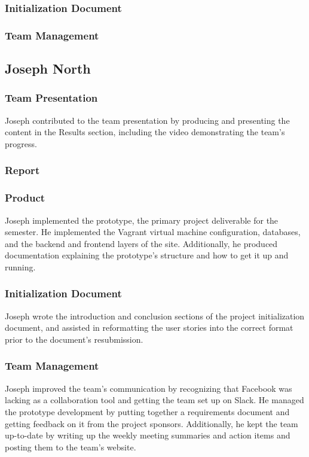 \documentclass[12pt]{article}
\begin{document}
\begin{spacing}{1.5}
\subsubsection{Initialization Document}
\subsubsection{Team Management}

\clearpage

\subsection{Joseph North}
\subsubsection{Team Presentation}
Joseph contributed to the team presentation by producing and presenting the content in the Results section, including the video demonstrating the team's progress.
\subsubsection{Report}
\subsubsection{Product}
Joseph implemented the prototype, the primary project deliverable for the semester. He implemented the Vagrant virtual machine configuration, databases, and the backend and frontend layers of the site. Additionally, he produced documentation explaining the prototype's structure and how to get it up and running.
\subsubsection{Initialization Document}
Joseph wrote the introduction and conclusion sections of the project initialization document, and assisted in reformatting the user stories into the correct format prior to the document's resubmission.
\subsubsection{Team Management}
Joseph improved the team's communication by recognizing that Facebook was lacking as a collaboration tool and getting the team set up on Slack. He managed the prototype development by putting together a requirements document and getting feedback on it from the project sponsors. Additionally, he kept the team up-to-date by writing up the weekly meeting summaries and action items and posting them to the team's website.


\end{spacing}
\end{document}
